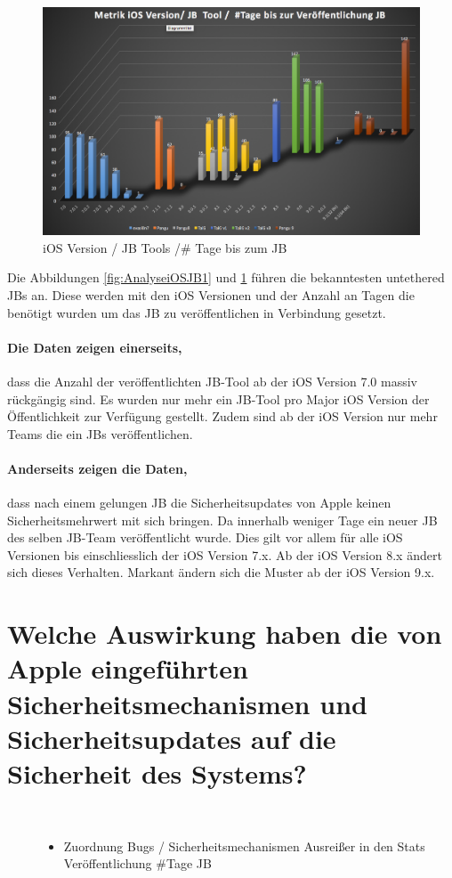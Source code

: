 \begin{figure}[htbp]
        \centering
                \includegraphics[scale=0.43]{Bilder/Frage1_2.png}
        \caption{iOS Version / JB Tools /\# Tage bis zum JB}
        \label{fig:AnalyseiOSJB2}
\end{figure}
Die Abbildungen \ref{fig:AnalyseiOSJB1} und \ref{fig:AnalyseiOSJB2} führen die bekanntesten untethered JBs an. Diese werden mit den iOS Versionen und der Anzahl an Tagen die benötigt wurden um das JB zu veröffentlichen in Verbindung gesetzt. 
\paragraph{Die Daten zeigen einerseits,} dass die Anzahl der veröffentlichten JB-Tool ab der iOS Version 7.0 massiv rückgängig sind. Es wurden nur mehr ein JB-Tool pro Major iOS Version der Öffentlichkeit zur Verfügung gestellt. Zudem sind ab der iOS Version nur mehr Teams die ein JBs veröffentlichen.
\paragraph{Anderseits zeigen die Daten,} dass nach einem gelungen JB die Sicherheitsupdates von Apple keinen Sicherheitsmehrwert mit sich bringen. Da innerhalb weniger Tage ein neuer JB des selben JB-Team veröffentlicht wurde. Dies gilt vor allem für alle iOS Versionen bis einschliesslich der iOS Version 7.x. Ab der iOS Version 8.x ändert sich dieses Verhalten. Markant ändern sich die Muster ab der iOS Version 9.x.

\section{Welche Auswirkung haben die von Apple eingeführten Sicherheitsmechanismen und Sicherheitsupdates auf die Sicherheit des Systems?}
\label{sec:Frage2}

            
     
\begin{description}
    \item[\parbox{\textwidth} {Antwort kurz INFO Katharina}]~\par
        \begin{itemize}
                \item Zuordnung Bugs / Sicherheitsmechanismen Ausreißer in den Stats Veröffentlichung \#Tage JB  
        \end{itemize}
\end{description} 
        




 